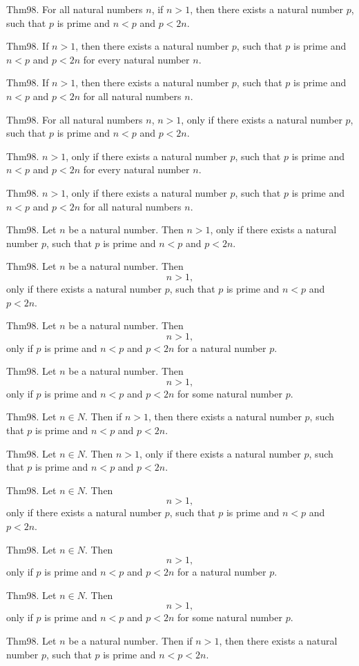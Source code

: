 \documentclass{article}
\begin{document}
Thm98. For all natural numbers $n$, if $n > 1$, then there exists a natural number $p$, such that $p$ is prime and $n < p$ and $p < 2 n$.

Thm98. If $n > 1$, then there exists a natural number $p$, such that $p$ is prime and $n < p$ and $p < 2 n$ for every natural number $n$.

Thm98. If $n > 1$, then there exists a natural number $p$, such that $p$ is prime and $n < p$ and $p < 2 n$ for all natural numbers $n$.

Thm98. For all natural numbers $n$, $n > 1$, only if there exists a natural number $p$, such that $p$ is prime and $n < p$ and $p < 2 n$.

Thm98. $n > 1$, only if there exists a natural number $p$, such that $p$ is prime and $n < p$ and $p < 2 n$ for every natural number $n$.

Thm98. $n > 1$, only if there exists a natural number $p$, such that $p$ is prime and $n < p$ and $p < 2 n$ for all natural numbers $n$.

Thm98. Let $n$ be a natural number. Then $n > 1$, only if there exists a natural number $p$, such that $p$ is prime and $n < p$ and $p < 2 n$.

Thm98. Let $n$ be a natural number. Then $$n > 1,$$ only if there exists a natural number $p$, such that $p$ is prime and $n < p$ and $p < 2 n$.

Thm98. Let $n$ be a natural number. Then $$n > 1,$$ only if $p$ is prime and $n < p$ and $p < 2 n$ for a natural number $p$.

Thm98. Let $n$ be a natural number. Then $$n > 1,$$ only if $p$ is prime and $n < p$ and $p < 2 n$ for some natural number $p$.

Thm98. Let $n \in N$. Then if $n > 1$, then there exists a natural number $p$, such that $p$ is prime and $n < p$ and $p < 2 n$.

Thm98. Let $n \in N$. Then $n > 1$, only if there exists a natural number $p$, such that $p$ is prime and $n < p$ and $p < 2 n$.

Thm98. Let $n \in N$. Then $$n > 1,$$ only if there exists a natural number $p$, such that $p$ is prime and $n < p$ and $p < 2 n$.

Thm98. Let $n \in N$. Then $$n > 1,$$ only if $p$ is prime and $n < p$ and $p < 2 n$ for a natural number $p$.

Thm98. Let $n \in N$. Then $$n > 1,$$ only if $p$ is prime and $n < p$ and $p < 2 n$ for some natural number $p$.

Thm98. Let $n$ be a natural number. Then if $n > 1$, then there exists a natural number $p$, such that $p$ is prime and $n < p < 2 n$.
\end{document}
